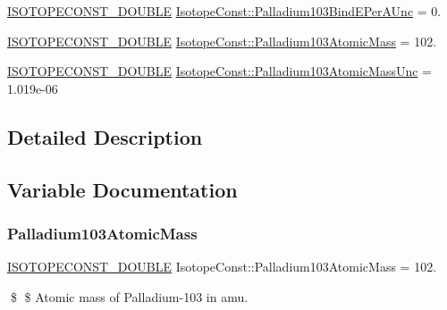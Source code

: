\begin{DoxyCompactItemize}
\mbox{\hyperlink{group___isotope_const-_macros_ga8f45a7272ce02c0b4c65c44636ed719a}{I\+S\+O\+T\+O\+P\+E\+C\+O\+N\+S\+T\+\_\+\+D\+O\+U\+B\+LE}} \mbox{\hyperlink{group___isotope_const-_palladium-_pd103_gaccbc26eaee727db3d5f4c7a0046c1249}{Isotope\+Const\+::\+Palladium103\+Bind\+E\+Per\+A\+Unc}} = 0.
\item 
\mbox{\hyperlink{group___isotope_const-_macros_ga8f45a7272ce02c0b4c65c44636ed719a}{I\+S\+O\+T\+O\+P\+E\+C\+O\+N\+S\+T\+\_\+\+D\+O\+U\+B\+LE}} \mbox{\hyperlink{group___isotope_const-_palladium-_pd103_ga9593e13963c97ac4f8ffcfadbd5e26bb}{Isotope\+Const\+::\+Palladium103\+Atomic\+Mass}} = 102.
\item 
\mbox{\hyperlink{group___isotope_const-_macros_ga8f45a7272ce02c0b4c65c44636ed719a}{I\+S\+O\+T\+O\+P\+E\+C\+O\+N\+S\+T\+\_\+\+D\+O\+U\+B\+LE}} \mbox{\hyperlink{group___isotope_const-_palladium-_pd103_ga33f26b201d0bffffde3c15bd12606316}{Isotope\+Const\+::\+Palladium103\+Atomic\+Mass\+Unc}} = 1.\+019e-\/06
\end{DoxyCompactItemize}


\subsection{Detailed Description}


\subsection{Variable Documentation}
\mbox{\label{group___isotope_const-_palladium-_pd103_ga9593e13963c97ac4f8ffcfadbd5e26bb}} 
\subsubsection{\texorpdfstring{Palladium103\+Atomic\+Mass}{Palladium103AtomicMass}}
{\footnotesize\ttfamily \mbox{\hyperlink{group___isotope_const-_macros_ga8f45a7272ce02c0b4c65c44636ed719a}{I\+S\+O\+T\+O\+P\+E\+C\+O\+N\+S\+T\+\_\+\+D\+O\+U\+B\+LE}} Isotope\+Const\+::\+Palladium103\+Atomic\+Mass = 102.}

\$ \$ Atomic mass of Palladium-\/103 in amu. \mbox{\label{group___isotope_const-_palladium-_pd103_ga33f26b201d0bffffde3c15bd12606316}} 
